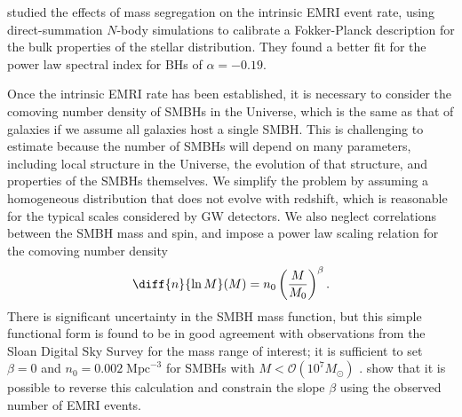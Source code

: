 
 studied the effects of mass segregation on the intrinsic EMRI event rate, using direct-summation $N$-body simulations to calibrate a Fokker-Planck description for the bulk properties of the stellar distribution. They found a better fit for the power law spectral index for BHs of $\alpha = -0.19$.

Once the intrinsic EMRI rate has been established, it is necessary to consider the comoving number density of SMBHs in the Universe, which is the same as that of galaxies if we assume all galaxies host a single SMBH. This is challenging to estimate because the number of SMBHs will depend on many parameters, including local structure in the Universe, the evolution of that structure, and properties of the SMBHs themselves. We simplify the problem by assuming a homogeneous distribution that does not evolve with redshift, which is reasonable for the typical scales considered by GW detectors. We also neglect correlations between the SMBH mass and spin, and impose a power law scaling relation for the comoving number density
\begin{equation}
\diff{n}{\ln M}(M) = n_0 \left(\frac{M}{M_0}\right)^\beta.
\end{equation}
There is significant uncertainty in the SMBH mass function, but this simple functional form is found to be in good agreement with observations from the Sloan Digital Sky Survey for the mass range of interest; it is sufficient to set $\beta = 0$ and $n_0 = 0.002 \; \mathrm{Mpc}^{-3}$ for SMBHs with $M < \mathcal{O}(10^7 M_\odot)$ \citep{greene_mass_2007, gair_lisa_2010}.  show that it is possible to reverse this calculation and constrain the slope $\beta$ using the observed number of EMRI events.

